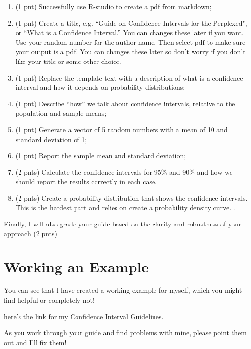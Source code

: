 \documentclass{tufte-handout}\usepackage[]{graphicx}\usepackage[]{color}
\begin{document}
\begin{enumerate}
  \item (1 pnt) Successfully use R-studio to create a pdf from markdown;
  \item (1 pnt) Create a title, e.g. ``Guide on Confidence Intervals for the Perplexed", or ``What is a Confidence Interval.'' You can changes these later if you want. Use your random number for the author name. Then select pdf to make sure your output is a pdf. You can changes these later so don't worry if you don't like your title or some other choice.
  \item (1 pnt) Replace the template text with a description of what is a confidence interval and how it depends on probability distributions; 
  \item (1 pnt) Describe ``how'' we talk about confidence intervals, relative to the population and sample means;
  \item (1 pnt) Generate a vector of 5 random numbers with a mean of 10 and standard deviation of 1;
  \item (1 pnt) Report the sample mean and standard deviation;
  \item (2 pnts) Calculate the confidence intervals for 95\% and 90\% and how we should report the results correctly in each case.
  \item (2 pnts) Create a probability distribution that shows the confidence intervals. This is the hardest part and relies on create a probability density curve. . 
  
\end{enumerate}

Finally, I will also grade your guide based on the clarity and robustness of your approach (2 pnts). 

\section{Working an Example}

You can see that I have created a working example for myself, which you might find helpful or completely not!

here's the link for my \href{https://github.com/marclos/beginnersluck/raw/master/Confidence_Intervals/Confidence_Intervals.pdf}{Confidence Interval Guidelines}. 

As you work through your guide and find problems with mine, please point them out and I'll fix them!

\FloatBarrier 
\begin{fullwidth}
%
%
\end{fullwidth}
\end{document}
